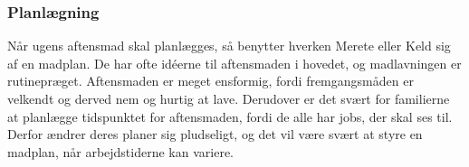 \subsubsection*{Planlægning}
Når ugens aftensmad skal planlægges, så benytter hverken Merete eller Keld sig af en madplan. De har ofte idéerne til aftensmaden i hovedet, og madlavningen er rutinepræget. Aftensmaden er meget ensformig, fordi fremgangsmåden er velkendt og derved nem og hurtig at lave. Derudover er det svært for familierne at planlægge tidspunktet for aftensmaden, fordi de alle har jobs, der skal ses til. Derfor ændrer deres planer sig pludseligt, og det vil være svært at styre en madplan, når arbejdstiderne kan variere.
